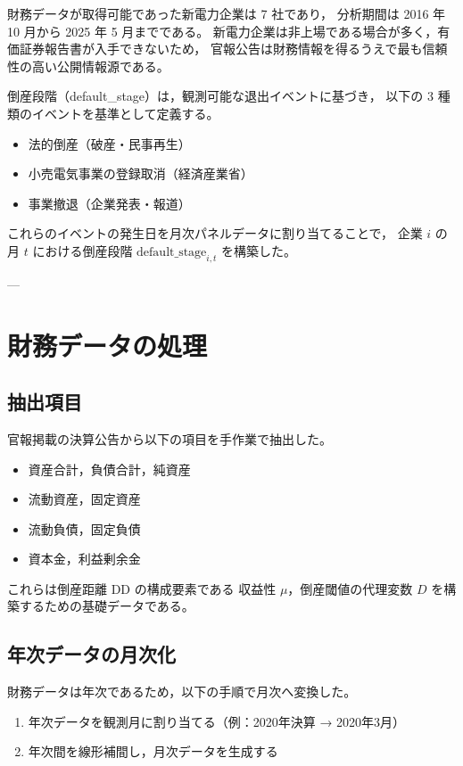 財務データが取得可能であった新電力企業は 7 社であり，
分析期間は 2016 年 10 月から 2025 年 5 月までである。
新電力企業は非上場である場合が多く，有価証券報告書が入手できないため，
官報公告は財務情報を得るうえで最も信頼性の高い公開情報源である。

倒産段階（default\_stage）は，観測可能な退出イベントに基づき，
以下の 3 種類のイベントを基準として定義する。

\begin{itemize}
\item 法的倒産（破産・民事再生）
\item 小売電気事業の登録取消（経済産業省）
\item 事業撤退（企業発表・報道）
\end{itemize}

これらのイベントの発生日を月次パネルデータに割り当てることで，
企業 $i$ の月 $t$ における倒産段階 $\text{default\_stage}_{i,t}$ を構築した。

---

\section{財務データの処理}

\subsection{抽出項目}

官報掲載の決算公告から以下の項目を手作業で抽出した。

\begin{itemize}
\item 資産合計，負債合計，純資産
\item 流動資産，固定資産
\item 流動負債，固定負債
\item 資本金，利益剰余金
\end{itemize}

これらは倒産距離 DD の構成要素である
収益性 $\mu$，倒産閾値の代理変数 $D$ を構築するための基礎データである。

\subsection{年次データの月次化}

財務データは年次であるため，以下の手順で月次へ変換した。

\begin{enumerate}
\item 年次データを観測月に割り当てる（例：2020年決算 → 2020年3月）
\item 年次間を線形補間し，月次データを生成する
\end{enumerate}

